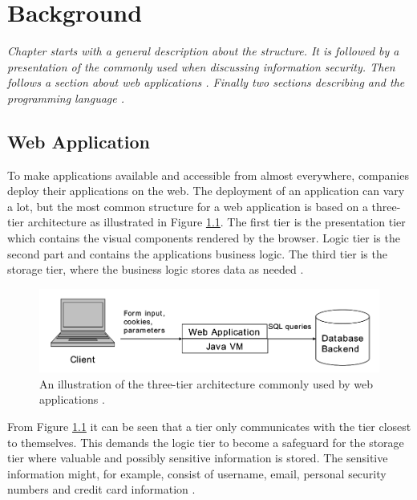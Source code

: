 \chapter{Background}
\label{Background}
\textit{Chapter starts with a general description about the \textit{} structure. It is followed by a presentation of the \textit{} commonly used when discussing information security. Then follows a section about web applications \textit{}. Finally two sections describing \textit{} and the programming language \textit{}.}



\section{Web Application}
\label{WebApplication}
To make applications available and accessible from almost everywhere, companies deploy their applications on the web. The deployment of an application can vary a lot, but the most common structure for a web application is based on a three-tier architecture as illustrated in Figure \ref{fig:webApplication-Haldar}. The first tier is the presentation tier which contains the visual components rendered by the browser. Logic tier is the second part and contains the applications business logic. The third tier is the storage tier, where the business logic stores data as needed \parencite{JustinClarke-Salt2009SIAa}.
 
\begin{figure}[H]
  \centering
  \includegraphics[width=\textwidth]{images/webApplication-Haldar.png}
  \caption{An illustration of the three-tier architecture commonly used by web applications \cite{Haldar}.}
  \label{fig:webApplication-Haldar}
\end{figure}

From Figure \ref{fig:webApplication-Haldar} it can be seen that a tier only communicates with the tier closest to themselves. This demands the logic tier to become a safeguard for the storage tier where valuable and possibly sensitive information is stored. The sensitive information might, for example, consist of username, email, personal security numbers and credit card information \parencite{JustinClarke-Salt2009SIAa}.

